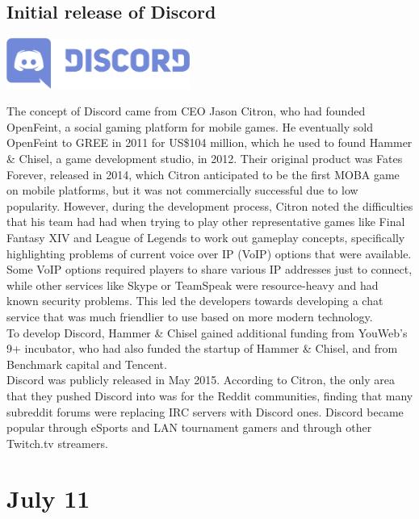 \documentclass[11pt]{report}
\begin{document}
\subsection{Initial release of Discord}
\vspace{2mm}\begin{center}\includegraphics[width=6cm]{./img/discordLogo.jpg}\end{center}
The concept of Discord came from CEO Jason Citron, who had founded OpenFeint, a social gaming platform for mobile games. He eventually sold OpenFeint to GREE in 2011 for US\$104 million, which he used to found Hammer \& Chisel, a game development studio, in 2012. Their original product was Fates Forever, released in 2014, which Citron anticipated to be the first MOBA game on mobile platforms, but it was not commercially successful due to low popularity. However, during the development process, Citron noted the difficulties that his team had had when trying to play other representative games like Final Fantasy XIV and League of Legends to work out gameplay concepts, specifically highlighting problems of current voice over IP (VoIP) options that were available. Some VoIP options required players to share various IP addresses just to connect, while other services like Skype or TeamSpeak were resource-heavy and had known security problems. This led the developers towards developing a chat service that was much friendlier to use based on more modern technology.\\
\indent To develop Discord, Hammer \& Chisel gained additional funding from YouWeb's 9+ incubator, who had also funded the startup of Hammer \& Chisel, and from Benchmark capital and Tencent.\\
\indent Discord was publicly released in May 2015. According to Citron, the only area that they pushed Discord into was for the Reddit communities, finding that many subreddit forums were replacing IRC servers with Discord ones. Discord became popular through eSports and LAN tournament gamers and through other Twitch.tv streamers.
\section{July 11}
\end{document}
